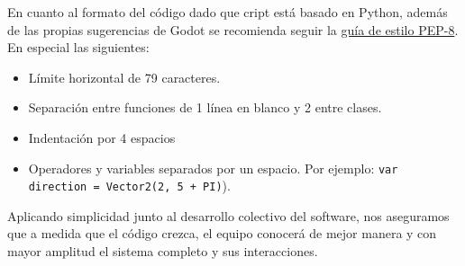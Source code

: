 En cuanto al formato del código dado que cript está basado en Python, además de las propias sugerencias de Godot se recomienda seguir la \href{https://www.python.org/dev/peps/pep-0008/}{guía de estilo PEP-8}. En especial las siguientes:

\begin{itemize}
	\item Límite horizontal de 79 caracteres.
	\item Separación entre funciones de 1 línea en blanco y 2 entre clases.
	\item Indentación por 4 espacios
	\item Operadores y variables separados por un espacio. Por ejemplo: {\small \texttt{var direction = Vector2(2, 5 + PI)}}).
\end{itemize}

Aplicando simplicidad junto al desarrollo colectivo del software, nos aseguramos que a medida que el código crezca, el equipo conocerá de mejor manera y con mayor amplitud el sistema completo y sus interacciones.

